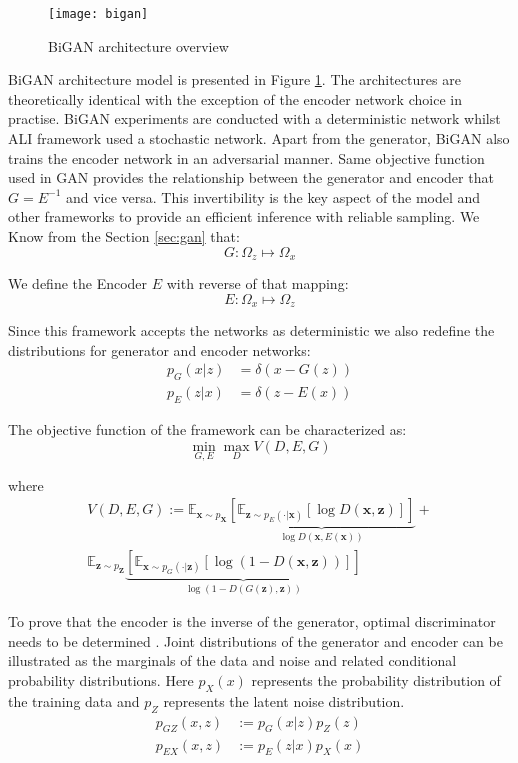{\begin{figure}[h!]
	\centering
	\texttt{[image: bigan]}
    \caption{BiGAN architecture overview}
    \label{fig:bigan_model}
\end{figure}


BiGAN architecture model is presented in Figure \ref{fig:bigan_model}. The architectures are
theoretically identical with the exception of the encoder network choice in practise. BiGAN
experiments are conducted with a deterministic network whilst ALI framework used a stochastic
network. Apart from the generator, BiGAN also trains the encoder network in an adversarial manner.
Same objective function used in GAN provides the relationship between the generator and encoder that
$G = E^{-1}$ and vice versa. This invertibility is the key aspect of the model and other
frameworks to provide an efficient inference with reliable sampling. We Know from the Section
\ref{sec:gan} that: 
$$
G : \Omega_{z} \mapsto \Omega_{x}
$$

We define the Encoder $E$ with reverse of that mapping:
$$
E : \Omega_{x} \mapsto \Omega_{z}
$$

Since this framework accepts the networks as deterministic we also redefine the distributions for
generator and encoder networks:
\begin{align*}
    p_G(x | z) & = \delta (x - G(z)) \\
    p_E(z | x) & = \delta (z - E(x))
\end{align*}

The objective function of the framework can be characterized as:
\begin{equation}
    \min _{G, E} \max _{D} V(D, E, G)
\end{equation}
 
where
\begin{multline}
    \label{eqn:bigan_v}
V(D, E, G) :=\mathbb{E}_{\mathbf{x} \sim p_{\mathbf{X}}}  \underbrace{\left[ \mathbb{E}_{\mathbf{z} \sim p_{E}(\cdot | \mathbf{x})}[\log D(\mathbf{x}, \mathbf{z})] \right]}_{\log D(\mathbf{x}, E(\mathbf{x}))} + \\ \mathbb{E}_{\mathbf{z} \sim p_{\mathbf{Z}}} \underbrace{  \left[ \mathbb{E}_{\mathbf{x} \sim p_{G}(\cdot | \mathbf{z})}[\log (1-D(\mathbf{x}, \mathbf{z}))] \right]}_{\log (1-D(G(\mathbf{z}), \mathbf{z}))}
\end{multline}

To prove that the encoder is the inverse of the generator, optimal discriminator needs to be
determined \cite{Donahue2017AdversarialFL}. Joint distributions of the generator and encoder can
be illustrated as the marginals of the data and noise and related conditional probability
distributions. Here $p_{X}(x)$ represents the probability distribution of the training data and $p_{Z}$ 
represents the latent noise distribution.
\begin{align}
    \label{eqn:bigan_gz}
    p_{GZ} (x, z ) &:= p_G(x | z) p_{Z} (z) \\[5pt] 
    \label{eqn:bigan_ex}
    p_{EX} (x, z ) &:= p_E(z | x) p_{X} (x) 
\end{align}

}
